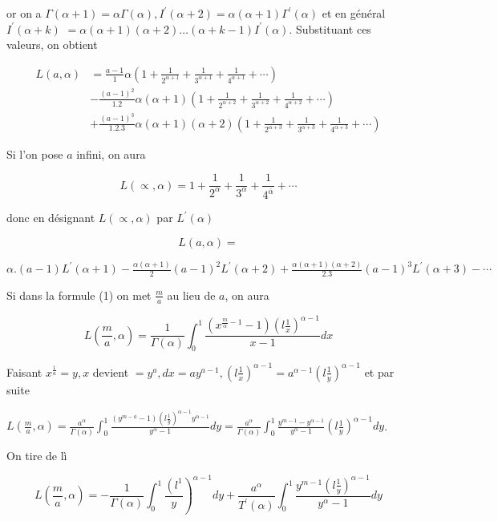 \documentclass{article}
\begin{document}
or on a \(\Gamma(\alpha+1)=\alpha \Gamma(\alpha), I^{\prime}(\alpha+2)=\alpha(\alpha+1) \Gamma^{\prime}(\alpha)\) et en général \(I^{\prime}(\alpha+k)\) \(=\alpha(\alpha+1)(\alpha+2) \ldots(\alpha+k-1) I^{\prime}(\alpha)\). Substituant ces valeurs, on obtient

\[
\begin{aligned}
L(a, \alpha) & =\frac{a-1}{1} \alpha\left(1+\frac{1}{2^{\alpha+1}}+\frac{1}{3^{\alpha+1}}+\frac{1}{4^{\alpha+1}}+\cdots\right) \\
& -\frac{(a-1)^{2}}{1.2} \alpha(\alpha+1)\left(1+\frac{1}{2^{\alpha+2}}+\frac{1}{3^{\alpha+2}}+\frac{1}{4^{\alpha+2}}+\cdots\right) \\
& +\frac{(a-1)^{3}}{1.2 .3} \alpha(\alpha+1)(\alpha+2)\left(1+\frac{1}{2^{\alpha+3}}+\frac{1}{3^{\alpha+3}}+\frac{1}{4^{\alpha+3}}+\cdots\right)
\end{aligned}
\]

Si l'on pose \(a\) infini, on aura

\[
L(\propto, \alpha)=1+\frac{1}{2^{\alpha}}+\frac{1}{3^{\alpha}}+\frac{1}{4^{\bar{\alpha}}}+\cdots
\]

donc en désignant \(L(\propto, \alpha)\) par \(L^{\prime}(\alpha)\)

\[
L(a, \alpha)=
\]

\(\alpha .(a-1) L^{\prime}(\alpha+1)-\frac{\alpha(\alpha+1)}{2}(a-1)^{2} L^{\prime}(\alpha+2)+\frac{\alpha(\alpha+1)(\alpha+2)}{2.3}(a-1)^{3} L^{\prime}(\alpha+3)-\cdots\)

Si dans la formule (1) on met \(\frac{m}{a}\) au lieu de \(a\), on aura

\[
L\left(\frac{m}{a}, \alpha\right)=\frac{1}{\Gamma(\alpha)} \int_{0}^{1} \frac{\left(x^{\frac{m}{\alpha}-1}-1\right)\left(l \frac{1}{x}\right)^{\alpha-1}}{x-1} d x
\]

Faisant \(x^{\frac{1}{a}}=y, x\) devient \(=y^{a}, d x=a y^{a-1},\left(l \frac{1}{x}\right)^{\alpha-1}=a^{\alpha-1}\left(l \frac{1}{y}\right)^{\alpha-1}\) et par suite

\(L\left(\frac{m}{a}, \alpha\right)=\frac{a^{\alpha}}{\Gamma(\alpha)} \int_{0}^{1} \frac{\left(y^{m-a}-1\right)\left(l \frac{1}{y}\right)^{\alpha-1} y^{\alpha-1}}{y^{\alpha}-1} d y=\frac{a^{\alpha}}{\Gamma(\alpha)} \int_{0}^{1} \frac{y^{m-1}-y^{\alpha-1}}{y^{\alpha}-1}\left(l \frac{1}{y}\right)^{\alpha-1} d y\).

On tire de lì

\[
\left.L\left(\frac{m}{a}, \alpha\right)=-\frac{1}{\Gamma(\alpha)} \int_{0}^{1} \frac{\left(l^{1}\right.}{y}\right)^{\alpha-1} d y+\frac{a^{\alpha}}{T^{\prime}(\alpha)} \int_{0}^{1} \frac{y^{m-1}\left(l \frac{1}{y}\right)^{\alpha-1}}{y^{\alpha}-1} d y
\]
\end{document}

